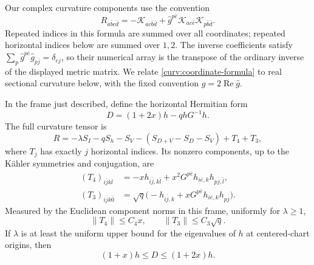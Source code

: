 Our complex curvature components use the convention
\begin{equation}\label{curv:coordinate-formula}
 R_{a\bar b c\bar d}
 =-\mathcal K_{ac\bar b\bar d}
   +\widehat g^{p\bar e}
       \mathcal K_{ac\bar e}\mathcal K_{p\bar b\bar d}.
\end{equation}
Repeated indices in this formula are summed over all coordinates;
repeated horizontal indices below are summed over $1,2$.
The inverse coefficients satisfy
$\sum_p\widehat g^{p\bar e}\widehat g_{p\bar j}
=\delta_{ej}$, so their numerical array is the transpose of the
ordinary inverse of the displayed metric matrix.
We relate \eqref{curv:coordinate-formula} to real sectional curvature
below, with the fixed convention $g=2\operatorname{Re}\widehat g$.

\begin{proposition}\label{curv:tensor}
In the frame just described, define the horizontal Hermitian form
\[
 D=(1+2x)h-qhG^{-1}h.
\]
The full curvature tensor is
\begin{equation}\label{curv:tensor-identity}
 R=-\lambda S_I-qS_h-S_V
    -(S_{D+V}-S_D-S_V)+T_4+T_3,
\end{equation}
where $T_j$ has exactly $j$ horizontal indices.  Its nonzero
components, up to the K\"ahler symmetries and conjugation, are
\begin{align}
 (T_4)_{i\bar j k\bar l}
   &=-x h_{i\bar j,k\bar l}
      +x^2G^{p\bar e}h_{i\bar e,k}h_{p\bar j,\bar l},
       \label{curv:four-horizontal-error}\\
 (T_3)_{i\bar j k\bar0}
   &=\sqrt q\bigl(-h_{i\bar j,k}
           +xG^{p\bar e}h_{i\bar e,k}h_{p\bar j}\bigr).
       \label{curv:three-horizontal-error}
\end{align}
Measured by the Euclidean component norms in this frame, uniformly
for $\lambda\ge1$,
\begin{equation}\label{curv:component-errors}
 \|T_4\|\le C_4x,\qquad \|T_3\|\le C_3\sqrt q.
\end{equation}
If $\lambda$ is at least the uniform upper bound for the eigenvalues
of $h$ at centered-chart origins, then
\begin{equation}\label{curv:D-bounds}
 (1+x)h\le D\le(1+2x)h.
\end{equation}
\end{proposition}

